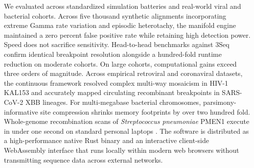 We evaluated \RhizAeon across standardized simulation batteries and real-world viral and bacterial cohorts.
Across five thousand synthetic alignments incorporating extreme Gamma rate variation and episodic heterotachy, the manifold engine maintained a zero percent false positive rate while retaining high detection power.
Speed does not sacrifice sensitivity.
Head-to-head benchmarks against 3Seq confirm identical breakpoint resolution alongside a hundred-fold runtime reduction on moderate cohorts.
On large cohorts, computational gains exceed three orders of magnitude.
Across empirical retroviral and coronaviral datasets, the continuous framework resolved complex multi-way mosaicism in HIV-1 KAL153 and accurately mapped circulating recombinant breakpoints in SARS-CoV-2 XBB lineages.
For multi-megabase bacterial chromosomes, parsimony-informative site compression shrinks memory footprints by over two hundred fold.
Whole-genome recombination scans of \textit{Streptococcus pneumoniae} PMEN1 execute in under one second on standard personal laptops \citep{croucher2011rapid}.
The software is distributed as a high-performance native Rust binary and an interactive client-side WebAssembly interface that runs locally within modern web browsers without transmitting sequence data across external networks.
